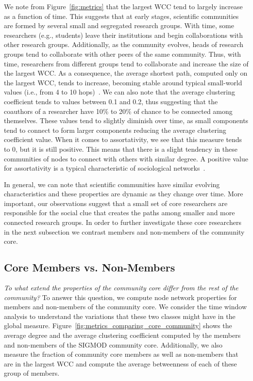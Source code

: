 We note from Figure~\ref{fig:metrics} that the largest WCC tend to largely increase as a function of time. This suggests that at early
stages, scientific communities are formed by several small and segregated research groups. With time, some researchers (e.g., students) leave their institutions and begin collaborations
with other research groups. Additionally, as the community evolves, heads of  research groups tend to collaborate with other peers of the same community. Thus, with time, researchers
from different groups tend to collaborate and increase the size of the largest WCC. As a consequence, the average shortest path, computed only on the largest
WCC, tends to increase, becoming stable around typical small-world values (i.e., from 4 to 10 hops)~\cite{mislove-2007-socialnetworks,fourdegrees_facebook}.  We can
also note that the average clustering coefficient tends to values between 0.1 and 0.2, thus suggesting that the coauthors of a researcher have 10\% to 20\% of chance to be connected
among themselves. These values tend to slightly diminish over time, as small components tend to connect to form larger components reducing the average clustering coefficient
value.  When it comes to assortativity, we see that this measure tends to 0, but it is still positive. This means that there is a slight tendency in these communities of nodes to
connect with others with similar degree.  A positive value for assortativity is a typical characteristic of sociological networks~\cite{Newman2003}.

In general, we can note that scientific communities have similar evolving characteristics and these properties are dynamic as they change over time.  More important, our
observations suggest that a small set of core researchers are responsible for the social clue that creates the paths among smaller and more connected research groups. In order to 
further investigate these core researchers in the next subsection we contrast members and non-members of the community core. 







\subsection{Core Members vs. Non-Members}
\label{sub:vs}

\textit{To what extend the properties of the community core differ from the rest of the community?}  To answer this question, we compute node network properties for members and non-members of the community
core. We consider the time window analysis to understand the variations that these two classes might have in the global measure.
Figure~\ref{fig:metrics_comparing_core_community} shows the average degree and the average clustering coefficient computed by the members and non-members of the SIGMOD 
community core. Additionally, we also measure the fraction of community core members as well as non-members that are in the largest WCC and compute the average betweenness of
each of these group of members. 

